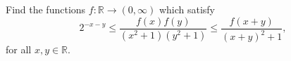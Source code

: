 Find the functions $f: \mathbb{R} \to (0, \infty)$ which satisfy $$2^{-x-y} \le \frac{f(x)f(y)}{(x^2+1)(y^2+1)} \le \frac{f(x+y)}{(x+y)^2+1},$$for all $x,y \in \mathbb{R}.$